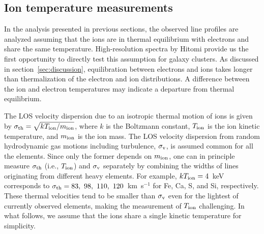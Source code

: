 \subsection{Ion temperature measurements}
\label{sec:iontemperature}

In the analysis presented in previous sections, the observed line profiles are analyzed assuming that the ions are in thermal equilibrium with electrons and share the same temperature. High-resolution spectra by Hitomi provide us the first opportunity to directly test this assumption for galaxy clusters. As discussed in section~\ref{sec:discussion}, equilibration between electrons and ions takes longer than thermalization of the electron and ion distributions. A difference between the ion and electron temperatures may indicate a departure from thermal equilibrium.

The LOS velocity dispersion due to an isotropic thermal motion of ions is given by $\sigma_{\rm th} = \sqrt{k T_{\rm ion}/m_{\rm ion}}$, where $k$ is the Boltzmann constant, $T_{\rm ion}$ is the ion kinetic temperature, and $m_{\rm ion}$ is the ion mass. The LOS velocity dispersion from random hydrodynamic gas motions including turbulence, $\sigma_{\rm v}$, is assumed common for all the elements. Since only the former depends on $m_{\rm ion}$, one can in principle measure $\sigma_{\rm th}$ (i.e., $T_{\rm ion}$) and $\sigma_{\rm v}$ separately by combining the widths of lines originating from different heavy elements. For example, $kT_{\rm ion} = 4$~keV corresponds to $\sigma_{\rm th}=83, ~98, ~110, ~120$~km~s$^{-1}$ for Fe, Ca, S, and Si, respectively. These thermal velocities tend to be smaller than $\sigma_{\rm v}$ even for the lightest of currently observed elements, making the measurement of $T_{\rm ion}$ challenging. In what follows, we assume that the ions share a single kinetic temperature for simplicity.

